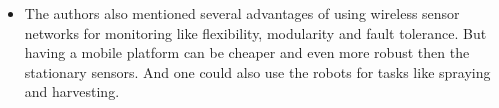 \begin{itemize}
        \item The authors also mentioned several advantages of using wireless sensor networks for monitoring like flexibility, 
        modularity and fault tolerance. But having a mobile platform can be cheaper and even more robust then the stationary sensors. 
        And one could also use the robots for tasks like spraying and harvesting.
    \end{itemize}
